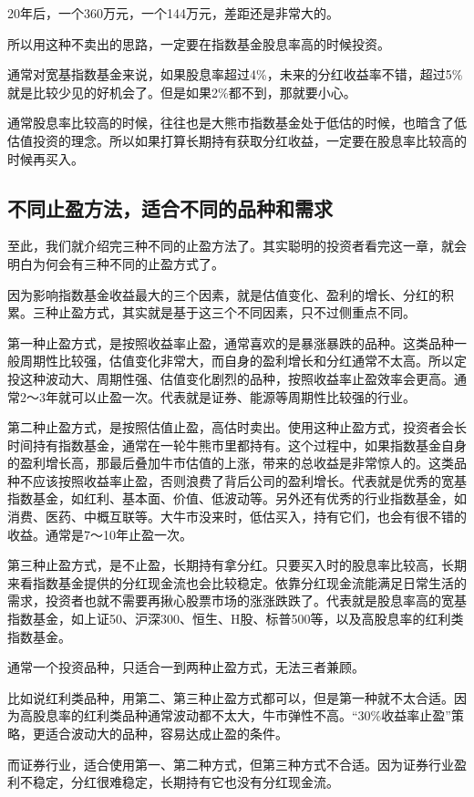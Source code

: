 20年后，一个360万元，一个144万元，差距还是非常大的。

所以用这种不卖出的思路，一定要在指数基金股息率高的时候投资。

通常对宽基指数基金来说，如果股息率超过4\%，未来的分红收益率不错，超过5\%就是比较少见的好机会了。但是如果2\%都不到，那就要小心。

通常股息率比较高的时候，往往也是大熊市指数基金处于低估的时候，也暗含了低估值投资的理念。所以如果打算长期持有获取分红收益，一定要在股息率比较高的时候再买入。

\subsection{不同止盈方法，适合不同的品种和需求}
至此，我们就介绍完三种不同的止盈方法了。其实聪明的投资者看完这一章，就会明白为何会有三种不同的止盈方式了。

因为影响指数基金收益最大的三个因素，就是估值变化、盈利的增长、分红的积累。三种止盈方式，其实就是基于这三个不同因素，只不过侧重点不同。

第一种止盈方式，是按照收益率止盈，通常喜欢的是暴涨暴跌的品种。这类品种一般周期性比较强，估值变化非常大，而自身的盈利增长和分红通常不太高。所以定投这种波动大、周期性强、估值变化剧烈的品种，按照收益率止盈效率会更高。通常2～3年就可以止盈一次。代表就是证券、能源等周期性比较强的行业。

第二种止盈方式，是按照估值止盈，高估时卖出。使用这种止盈方式，投资者会长时间持有指数基金，通常在一轮牛熊市里都持有。这个过程中，如果指数基金自身的盈利增长高，那最后叠加牛市估值的上涨，带来的总收益是非常惊人的。这类品种不应该按照收益率止盈，否则浪费了背后公司的盈利增长。代表就是优秀的宽基指数基金，如红利、基本面、价值、低波动等。另外还有优秀的行业指数基金，如消费、医药、中概互联等。大牛市没来时，低估买入，持有它们，也会有很不错的收益。通常是7～10年止盈一次。

第三种止盈方式，是不止盈，长期持有拿分红。只要买入时的股息率比较高，长期来看指数基金提供的分红现金流也会比较稳定。依靠分红现金流能满足日常生活的需求，投资者也就不需要再揪心股票市场的涨涨跌跌了。代表就是股息率高的宽基指数基金，如上证50、沪深300、恒生、H股、标普500等，以及高股息率的红利类指数基金。

通常一个投资品种，只适合一到两种止盈方式，无法三者兼顾。

比如说红利类品种，用第二、第三种止盈方式都可以，但是第一种就不太合适。因为高股息率的红利类品种通常波动都不太大，牛市弹性不高。“30\%收益率止盈”策略，更适合波动大的品种，容易达成止盈的条件。

而证券行业，适合使用第一、第二种方式，但第三种方式不合适。因为证券行业盈利不稳定，分红很难稳定，长期持有它也没有分红现金流。

